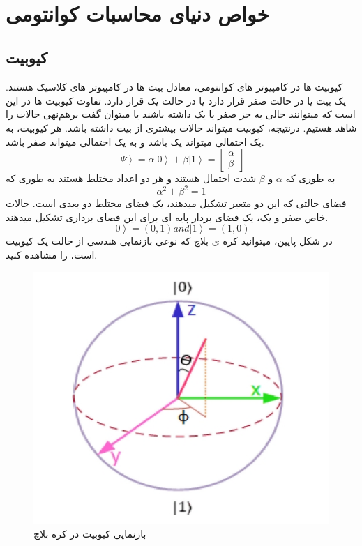 ‌\chapter{‌خواص دنیای محاسبات کوانتومی}
\section{کیوبیت}
کیوبیت ها
 در کامپیوتر های کوانتومی، معادل بیت ها
 در کامپیوتر های کلاسیک هستند. یک بیت یا در حالت صفر قرار دارد یا در حالت یک قرار دارد. تفاوت کیوبیت ها در این است که میتوانند حالی به جز صفر یا یک داشته باشند یا میتوان گفت برهم‌نهی 
حالات را شاهد هستیم. درنتیجه، کیوبیت میتواند حالات بیشتری از بیت داشته باشد. هر کیوبیت، به یک احتمالی میتواند یک باشد و به یک احتمالی میتواند صفر باشد. 
\begin{equation}
\left|\Psi\right\rangle = \alpha\left|0\right\rangle + \beta\left|1\right\rangle = \begin{bmatrix}
 \alpha
\\
\beta
\end{bmatrix}
\end{equation}
به طوری که 
$\alpha$
 و 
$\beta$
  شدت احتمال هستند و هر دو اعداد مختلط هستند به طوری که
\begin{equation}
\alpha^{2} + \beta^{2} = 1
\end{equation}
فضای حالتی که این دو متغیر تشکیل میدهند، یک فضای مختلط دو بعدی است.  حالات خاص صفر و یک، یک فضای بردار پایه ای
برای این فضای برداری تشکیل میدهند.
\begin{equation}
\left|0\right\rangle = (0, 1) and \left|1\right\rangle = (1, 0)
\end{equation}
در شکل پایین، میتوانید کره ی بلاچ
  که نوعی بازنمایی هندسی از حالت یک کیوبیت است، را مشاهده کنید.
\begin{figure}[!h]
\centerline{\includegraphics[width=.5\textwidth]{bloch.jpeg}}
\caption{بازنمایی کیوبیت در کره بلاچ}
\end{figure}
